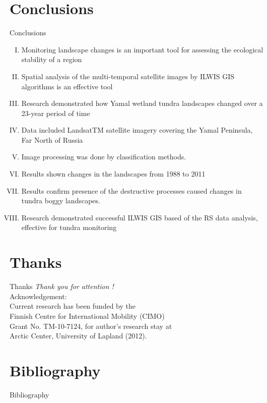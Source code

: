 \documentclass[pdflatex,compress,9pt,
	xcolor={dvipsnames,dvipsnames,svgnames,x11names,table},
	hyperref={colorlinks = true,breaklinks = true, urlcolor = NavyBlue, breaklinks = true}]{beamer}
\begin{document}
\section{Conclusions}
\begin{frame}{Conclusions}
\begin{enumerate}[I.]
            \item Monitoring landscape changes is an important tool for assessing the ecological stability of a region
            \item Spatial analysis of the multi-temporal satellite images by ILWIS GIS algorithms is an effective tool
            \item Research demonstrated how Yamal wetland tundra landscapes changed over a 23-year period of time
            \item Data included LandsatTM satellite imagery covering the Yamal Peninsula, Far North of Russia
            \item Image processing was done by classification methods.
            \item Results shown changes in the landscapes from 1988 to 2011
            \item Results confirm presence of the destructive processes caused changes in tundra boggy landscapes.
            \item Research demonstrated successful ILWIS GIS based of the RS data analysis, effective for tundra monitoring
\end{enumerate}
\end{frame}


\section{Thanks}
\begin{frame}{Thanks}
  	\centering \LARGE 
  	\emph{Thank you for attention !}\\
	\vspace{5em}
\normalsize
Acknowledgement: \\
Current research has been funded by the \\
Finnish Centre for International Mobility (CIMO) \\
Grant No. TM-10-7124, for author's research stay at \\
Arctic Center, University of Lapland (2012).
\end{frame}

\section{Bibliography}
\Large{Bibliography}
\nocite{*}
\printbibliography[heading=none]
	
\end{document}
